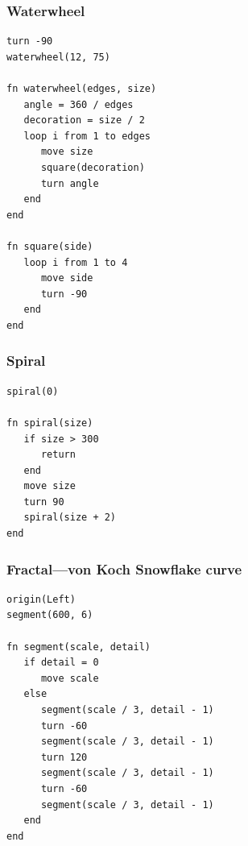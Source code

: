 \documentclass[12pt,a4paper,twoside]{article}
\renewcommand{\_}{\texttt{\symbol{95}}}
\begin{document}
\subsubsection*{Waterwheel}

\begin{verbatim}
turn -90
waterwheel(12, 75)

fn waterwheel(edges, size)
   angle = 360 / edges
   decoration = size / 2
   loop i from 1 to edges
      move size
      square(decoration)
      turn angle
   end
end

fn square(side)
   loop i from 1 to 4
      move side
      turn -90
   end
end
\end{verbatim}

\subsubsection*{Spiral}

\begin{verbatim}
spiral(0)

fn spiral(size)
   if size > 300
      return
   end
   move size
   turn 90
   spiral(size + 2)
end
\end{verbatim}

\subsubsection*{Fractal---von Koch Snowflake curve}

\begin{verbatim}
origin(Left)
segment(600, 6)

fn segment(scale, detail)
   if detail = 0
      move scale
   else
      segment(scale / 3, detail - 1)
      turn -60
      segment(scale / 3, detail - 1)
      turn 120
      segment(scale / 3, detail - 1)
      turn -60
      segment(scale / 3, detail - 1)
   end
end
\end{verbatim}
\end{document}
